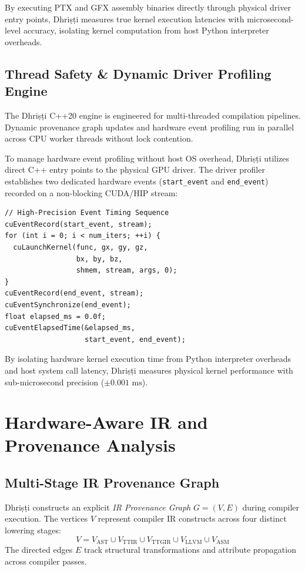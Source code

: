 \documentclass[10pt,journal,compsoc]{IEEEtran}
\begin{document}
By executing PTX and GFX assembly binaries directly through physical driver entry points, Dhri\d{s}\d{t}i measures true kernel execution latencies with microsecond-level accuracy, isolating kernel computation from host Python interpreter overheads.


\subsection{Thread Safety & Dynamic Driver Profiling Engine}
The Dhri\d{s}\d{t}i C++20 engine is engineered for multi-threaded compilation pipelines. Dynamic provenance graph updates and hardware event profiling run in parallel across CPU worker threads without lock contention.

To manage hardware event profiling without host OS overhead, Dhri\d{s}\d{t}i utilizes direct C++ entry points to the physical GPU driver. The driver profiler establishes two dedicated hardware events (\texttt{start\_event} and \texttt{end\_event}) recorded on a non-blocking CUDA/HIP stream:
\begin{lstlisting}
// High-Precision Event Timing Sequence
cuEventRecord(start_event, stream);
for (int i = 0; i < num_iters; ++i) {
  cuLaunchKernel(func, gx, gy, gz,
                 bx, by, bz,
                 shmem, stream, args, 0);
}
cuEventRecord(end_event, stream);
cuEventSynchronize(end_event);
float elapsed_ms = 0.0f;
cuEventElapsedTime(&elapsed_ms,
                   start_event, end_event);
\end{lstlisting}

By isolating hardware kernel execution time from Python interpreter overheads and host system call latency, Dhri\d{s}\d{t}i measures physical kernel performance with sub-microsecond precision ($\pm 0.001\text{ ms}$).

\section{Hardware-Aware IR and Provenance Analysis}\label{sec:provenance}

\subsection{Multi-Stage IR Provenance Graph}
Dhri\d{s}\d{t}i constructs an explicit \textit{IR Provenance Graph} $G = (V, E)$ during compiler execution. The vertices $V$ represent compiler IR constructs across four distinct lowering stages:
\begin{equation}
V = V_{\text{AST}} \cup V_{\text{TTIR}} \cup V_{\text{TTGIR}} \cup V_{\text{LLVM}} \cup V_{\text{ASM}}
\end{equation}
The directed edges $E$ track structural transformations and attribute propagation across compiler passes.
\end{document}
